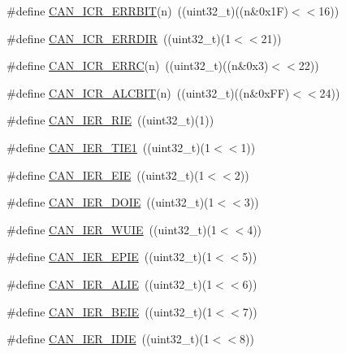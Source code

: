 \begin{DoxyCompactItemize}
\item 
\#define \hyperlink{group___c_a_n___private___macros_ga36456415fc987a1b68a94e576f5feabb}{\-C\-A\-N\-\_\-\-I\-C\-R\-\_\-\-E\-R\-R\-B\-I\-T}(n)~((uint32\-\_\-t)((n\&0x1\-F)$<$$<$16))
\item 
\#define \hyperlink{group___c_a_n___private___macros_ga38c6c29f1cc9c4570f68990f2bdd76fb}{\-C\-A\-N\-\_\-\-I\-C\-R\-\_\-\-E\-R\-R\-D\-I\-R}~((uint32\-\_\-t)(1$<$$<$21))
\item 
\#define \hyperlink{group___c_a_n___private___macros_ga6caeaef82dc8ab054b0f3a1ee6ce8415}{\-C\-A\-N\-\_\-\-I\-C\-R\-\_\-\-E\-R\-R\-C}(n)~((uint32\-\_\-t)((n\&0x3)$<$$<$22))
\item 
\#define \hyperlink{group___c_a_n___private___macros_ga0b88846b094194cb4775d49fc1e9727a}{\-C\-A\-N\-\_\-\-I\-C\-R\-\_\-\-A\-L\-C\-B\-I\-T}(n)~((uint32\-\_\-t)((n\&0x\-F\-F)$<$$<$24))
\item 
\#define \hyperlink{group___c_a_n___private___macros_ga25db0b070c10a960394a51c1374c5850}{\-C\-A\-N\-\_\-\-I\-E\-R\-\_\-\-R\-I\-E}~((uint32\-\_\-t)(1))
\item 
\#define \hyperlink{group___c_a_n___private___macros_ga8acb357ce8234e896c4f4cd550beb2c8}{\-C\-A\-N\-\_\-\-I\-E\-R\-\_\-\-T\-I\-E1}~((uint32\-\_\-t)(1$<$$<$1))
\item 
\#define \hyperlink{group___c_a_n___private___macros_ga7c5a45cabe99423ecbbd05df116dad20}{\-C\-A\-N\-\_\-\-I\-E\-R\-\_\-\-E\-I\-E}~((uint32\-\_\-t)(1$<$$<$2))
\item 
\#define \hyperlink{group___c_a_n___private___macros_ga0040248415efe4811e416b4265873a70}{\-C\-A\-N\-\_\-\-I\-E\-R\-\_\-\-D\-O\-I\-E}~((uint32\-\_\-t)(1$<$$<$3))
\item 
\#define \hyperlink{group___c_a_n___private___macros_gad9eff97f356d550aa52f0545e3c459d2}{\-C\-A\-N\-\_\-\-I\-E\-R\-\_\-\-W\-U\-I\-E}~((uint32\-\_\-t)(1$<$$<$4))
\item 
\#define \hyperlink{group___c_a_n___private___macros_gae01dedfd23e22e9fb22466c4a8ef7b9d}{\-C\-A\-N\-\_\-\-I\-E\-R\-\_\-\-E\-P\-I\-E}~((uint32\-\_\-t)(1$<$$<$5))
\item 
\#define \hyperlink{group___c_a_n___private___macros_ga71c94a127f0774689febf52d4e08f974}{\-C\-A\-N\-\_\-\-I\-E\-R\-\_\-\-A\-L\-I\-E}~((uint32\-\_\-t)(1$<$$<$6))
\item 
\#define \hyperlink{group___c_a_n___private___macros_ga9f2bbfc38e14781668ae928252b3639d}{\-C\-A\-N\-\_\-\-I\-E\-R\-\_\-\-B\-E\-I\-E}~((uint32\-\_\-t)(1$<$$<$7))
\item 
\#define \hyperlink{group___c_a_n___private___macros_gac81c8d3f2c4417b30af2236ae66c4926}{\-C\-A\-N\-\_\-\-I\-E\-R\-\_\-\-I\-D\-I\-E}~((uint32\-\_\-t)(1$<$$<$8))

\end{DoxyCompactItemize}
